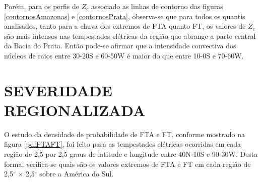 Porém, para os perfis de $Z_c$ associado as linhas de contorno das figuras \ref{contornosAmazonas} e \ref{contornosPrata}, observa-se que para todos os quantis analisados, tanto para a chuva dos extremos de FTA quanto FT, os valores de $Z_c$ são mais intensos nas tempestades elétricas da região que abrange a parte central da Bacia do Prata. Então pode-se afirmar que a intensidade convectiva dos núcleos de raios entre 30-20S e 60-50W é maior do que entre 10-0S e 70-60W. 


\section{SEVERIDADE REGIONALIZADA}


O estudo da densidade de probabilidade de FTA e FT, conforme mostrado na figura \ref{pdfFTAFT}, foi feito para as tempestades elétricas ocorridas em cada região de 2,5 por 2,5 graus de latitude e longitude entre 40N-10S e 90-30W. Desta forma, verifica-se quais são os valores extremos de FTA e FT em cada região de 2,5$^{\circ}$ $\times$ 2,5$^{\circ}$ sobre a América do Sul. 



